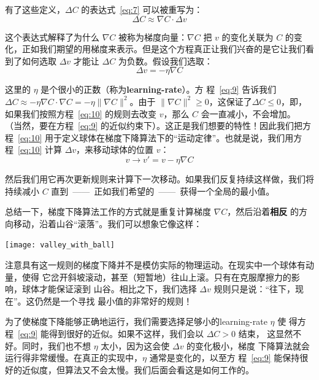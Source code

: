 有了这些定义，$\Delta C$ 的表达式~\eqref{eq:7} 可以被重写为：
\begin{equation}
  \Delta C \approx \nabla C \cdot \Delta v
  \label{eq:9}\tag{9}
\end{equation}

这个表达式解释了为什么 $\nabla C$ 被称为梯度向量：$\nabla C$ 把 $v$ 的变化关联为
$C$ 的变化，正如我们期望的用梯度来表示。但是这个方程真正让我们兴奋的是它让我们看
到了如何选取 $\Delta v$ 才能让 $\Delta C$ 为负数。假设我们选取：
\begin{equation}
  \Delta v = -\eta \nabla C
  \label{eq:10}\tag{10}
\end{equation}

这里的 $\eta$ 是个很小的正数（称为\textbf{\gls{learning-rate}}）。方
程~\eqref{eq:9} 告诉我们 $\Delta C \approx -\eta \nabla C \cdot \nabla C = -\eta
\|\nabla C\|^2$。由于 $\| \nabla C \|^2 \geq 0$，这保证了$\Delta C \leq 0$，即，
如果我们按照方程~\eqref{eq:10} 的规则去改变 $v$，那么 $C$ 会一直减小，不会增加。
（当然，要在方程~\eqref{eq:9} 的近似约束下）。这正是我们想要的特性！因此我们把方
程~\eqref{eq:10} 用于定义球体在梯度下降算法下的“运动定律”。也就是说，我们用方
程~\eqref{eq:10} 计算 $\Delta v$，来移动球体的位置 $v$：
\begin{equation}
  v \rightarrow v' = v -\eta \nabla C
  \label{eq:11}\tag{11}
\end{equation}

然后我们用它再次更新规则来计算下一次移动。如果我们反复持续这样做，我们将持续减小
$C$ 直到~——~正如我们希望的~——~获得一个全局的最小值。

总结一下，梯度下降算法工作的方式就是重复计算梯度 $\nabla C$，然后沿着\textbf{相反}
的方向移动，沿着山谷“滚落”。我们可以想象它像这样：
\begin{center}
  \texttt{[image: valley\_with\_ball]}
\end{center}

注意具有这一规则的梯度下降并不是模仿实际的物理运动。在现实中一个球体有动量，使得
它岔开斜坡滚动，甚至（短暂地）往山上滚。只有在克服摩擦力的影响，球体才能保证滚到
山谷。相比之下，我们选择 $\Delta v$ 规则只是说：“往下，现在”。这仍然是一个寻找
最小值的非常好的规则！

为了使梯度下降能够正确地运行，我们需要选择足够小的\gls*{learning-rate} $\eta$ 使
得方程~\eqref{eq:9} 能得到很好的近似。如果不这样，我们会以 $\Delta C > 0$ 结束，
这显然不好。同时，我们也不想 $\eta$ 太小，因为这会使 $\Delta v$ 的变化极小，梯度
下降算法就会运行得非常缓慢。在真正的实现中，$\eta$ 通常是变化的，以至方
程~\eqref{eq:9} 能保持很好的近似度，但算法又不会太慢。我们后面会看这是如何工作的。


